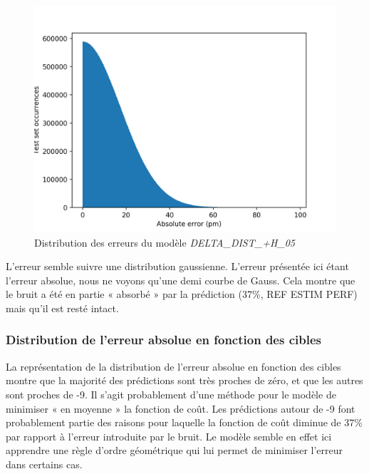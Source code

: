 \begin{figure}[!h]
	\centering
	
	\includegraphics[scale=0.7]{../figures/DELTA_DIST_+H_05/DELTA_DIST+H_05_distrib_rmse_val.png}	
	
	\caption{Distribution des erreurs du modèle \emph{DELTA\_DIST\_+H\_05}}
\end{figure}

L'erreur semble suivre une distribution gaussienne. L'erreur présentée ici étant l'erreur absolue, nous ne voyons qu'une demi courbe de Gauss. Cela montre que le bruit a été en partie « absorbé » par la prédiction (37\%, REF ESTIM PERF) mais qu'il est resté intact.

\subsubsection{Distribution de l'erreur absolue en fonction des cibles}

La représentation de la distribution de l'erreur absolue en fonction des cibles montre que la majorité des prédictions sont très proches de zéro, et que les autres sont proches de -9. Il s'agit probablement d'une méthode pour le modèle de minimiser « en moyenne » la fonction de coût. Les prédictions autour de -9 font probablement partie des raisons pour laquelle la fonction de coût diminue de 37\% par rapport à l'erreur introduite par le bruit. Le modèle semble en effet ici apprendre une règle d'ordre géométrique qui lui permet de minimiser l'erreur dans certains cas.


